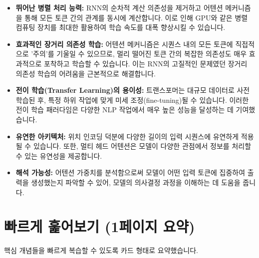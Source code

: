 \documentclass[11pt,a4paper]{article}
\theoremstyle{definition}
\begin{document}
\begin{tcolorbox}[summary, title={트랜스포머의 주요 장점}]
\begin{itemize}
    \item \textbf{뛰어난 병렬 처리 능력:} RNN의 순차적 계산 의존성을 제거하고 어텐션 메커니즘을 통해 모든 토큰 간의 관계를 동시에 계산합니다. 이로 인해 GPU와 같은 병렬 컴퓨팅 장치를 최대한 활용하여 학습 속도를 대폭 향상시킬 수 있습니다.
    \item \textbf{효과적인 장거리 의존성 학습:} 어텐션 메커니즘은 시퀀스 내의 모든 토큰에 직접적으로 '주의'를 기울일 수 있으므로, 멀리 떨어진 토큰 간의 복잡한 의존성도 매우 효과적으로 포착하고 학습할 수 있습니다. 이는 RNN의 고질적인 문제였던 장거리 의존성 학습의 어려움을 근본적으로 해결합니다.
    \item \textbf{전이 학습(Transfer Learning)의 용이성:} 트랜스포머는 대규모 데이터로 사전 학습된 후, 특정 하위 작업에 맞게 미세 조정(fine-tuning)될 수 있습니다. 이러한 전이 학습 패러다임은 다양한 NLP 작업에서 매우 높은 성능을 달성하는 데 기여했습니다.
    \item \textbf{유연한 아키텍처:} 위치 인코딩 덕분에 다양한 길이의 입력 시퀀스에 유연하게 적용될 수 있습니다. 또한, 멀티 헤드 어텐션은 모델이 다양한 관점에서 정보를 처리할 수 있는 유연성을 제공합니다.
    \item \textbf{해석 가능성:} 어텐션 가중치를 분석함으로써 모델이 어떤 입력 토큰에 집중하여 출력을 생성했는지 파악할 수 있어, 모델의 의사결정 과정을 이해하는 데 도움을 줍니다.
\end{itemize}
\end{tcolorbox}

\newpage
\section{빠르게 훑어보기 (1페이지 요약)}
핵심 개념들을 빠르게 복습할 수 있도록 카드 형태로 요약했습니다.
\end{document}
